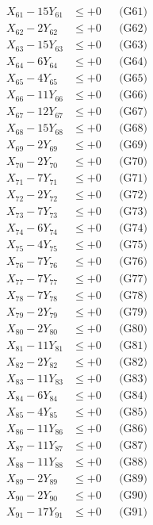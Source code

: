 \documentclass[a4paper,10pt]{article}
\begin{document}
{\begin{align}
X_{61} - 15Y_{61} &\leq +0 && \text{(G61)} \\
X_{62} - 2Y_{62} &\leq +0 && \text{(G62)} \\
X_{63} - 15Y_{63} &\leq +0 && \text{(G63)} \\
X_{64} - 6Y_{64} &\leq +0 && \text{(G64)} \\
X_{65} - 4Y_{65} &\leq +0 && \text{(G65)} \\
X_{66} - 11Y_{66} &\leq +0 && \text{(G66)} \\
X_{67} - 12Y_{67} &\leq +0 && \text{(G67)} \\
X_{68} - 15Y_{68} &\leq +0 && \text{(G68)} \\
X_{69} - 2Y_{69} &\leq +0 && \text{(G69)} \\
\allowbreak
X_{70} - 2Y_{70} &\leq +0 && \text{(G70)} \\
X_{71} - 7Y_{71} &\leq +0 && \text{(G71)} \\
X_{72} - 2Y_{72} &\leq +0 && \text{(G72)} \\
X_{73} - 7Y_{73} &\leq +0 && \text{(G73)} \\
X_{74} - 6Y_{74} &\leq +0 && \text{(G74)} \\
X_{75} - 4Y_{75} &\leq +0 && \text{(G75)} \\
X_{76} - 7Y_{76} &\leq +0 && \text{(G76)} \\
X_{77} - 7Y_{77} &\leq +0 && \text{(G77)} \\
X_{78} - 7Y_{78} &\leq +0 && \text{(G78)} \\
X_{79} - 2Y_{79} &\leq +0 && \text{(G79)} \\
\allowbreak
X_{80} - 2Y_{80} &\leq +0 && \text{(G80)} \\
X_{81} - 11Y_{81} &\leq +0 && \text{(G81)} \\
X_{82} - 2Y_{82} &\leq +0 && \text{(G82)} \\
X_{83} - 11Y_{83} &\leq +0 && \text{(G83)} \\
X_{84} - 6Y_{84} &\leq +0 && \text{(G84)} \\
X_{85} - 4Y_{85} &\leq +0 && \text{(G85)} \\
X_{86} - 11Y_{86} &\leq +0 && \text{(G86)} \\
X_{87} - 11Y_{87} &\leq +0 && \text{(G87)} \\
X_{88} - 11Y_{88} &\leq +0 && \text{(G88)} \\
X_{89} - 2Y_{89} &\leq +0 && \text{(G89)} \\
\allowbreak
X_{90} - 2Y_{90} &\leq +0 && \text{(G90)} \\
X_{91} - 17Y_{91} &\leq +0 && \text{(G91)} \\

\end{align}}
\end{document}
